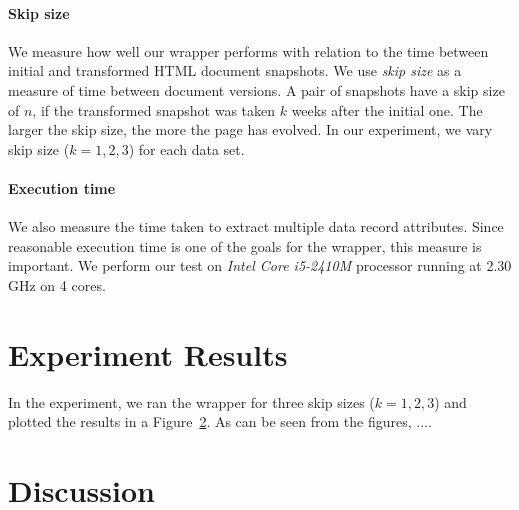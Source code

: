 \paragraph{Skip size} We measure how well our wrapper performs with relation to the time between initial and transformed HTML document snapshots. We use \emph{skip size} as a measure of time between document versions. A pair of snapshots have a skip size of $n$, if the transformed snapshot was taken $k$ weeks after the initial one. The larger the skip size, the more the page has evolved. In our experiment, we vary skip size ($k = 1, 2, 3$) for each data set.

\paragraph{Execution time} We also measure the time taken to extract multiple data record attributes. Since reasonable execution time is one of the goals for the wrapper, this measure is important. We perform our test on \emph{Intel Core i5-2410M} processor running at 2.30 GHz on 4 cores.


\section{Experiment Results}

In the experiment, we ran the wrapper for three skip sizes ($k = 1, 2, 3$) and plotted the results in a Figure~\ref{}. As can be seen from the figures, ....



\section{Discussion}


